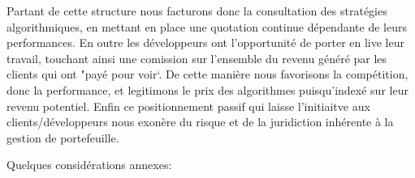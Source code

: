 Partant de cette structure nous facturons donc la consultation des stratégies
algorithmiques, en mettant en place une quotation continue dépendante de leurs 
performances. En outre les développeurs ont l'opportunité de porter en live
leur travail, touchant ainsi une comission sur l'ensemble du revenu généré
par les clients qui ont "payé pour voir`.\newline
De cette manière nous favorisons la compétition, donc la performance, et
legitimons le prix des algorithmes puisqu'indexé sur leur revenu potentiel.
Enfin ce positionnement passif qui laisse l'initiaitve aux clients/développeurs
nous exonère du risque et de la juridiction inhérente à la gestion de
portefeuille.\newline
\newline


Quelques considérations annexes:\newline

